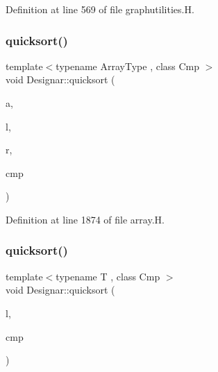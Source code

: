 Definition at line 569 of file graphutilities.\+H.

\mbox{\label{namespace_designar_a2e26fd2dcbb26e5ffc96a960dd4caa94}} 
\subsubsection{\texorpdfstring{quicksort()}{quicksort()}\hspace{0.1cm}{\footnotesize\ttfamily [1/14]}}
{\footnotesize\ttfamily template$<$typename Array\+Type , class Cmp $>$ \\
void Designar\+::quicksort (\begin{DoxyParamCaption}\item[{Array\+Type \&}]{a,  }\item[{\hyperlink{namespace_designar_a9d113d66a39e82b73727c72cd3a52f73}{lint\+\_\+t}}]{l,  }\item[{\hyperlink{namespace_designar_a9d113d66a39e82b73727c72cd3a52f73}{lint\+\_\+t}}]{r,  }\item[{Cmp \&}]{cmp }\end{DoxyParamCaption})}



Definition at line 1874 of file array.\+H.

\mbox{\label{namespace_designar_a7e1e90568197223b560306a01b496969}} 
\subsubsection{\texorpdfstring{quicksort()}{quicksort()}\hspace{0.1cm}{\footnotesize\ttfamily [2/14]}}
{\footnotesize\ttfamily template$<$typename T , class Cmp $>$ \\
void Designar\+::quicksort (\begin{DoxyParamCaption}\item[{\hyperlink{class_designar_1_1_node_s_l_list}{Node\+S\+L\+List}$<$ T $>$ \&}]{l,  }\item[{Cmp \&}]{cmp }\end{DoxyParamCaption})\hspace{0.3cm}{\ttfamily [inline]}}



